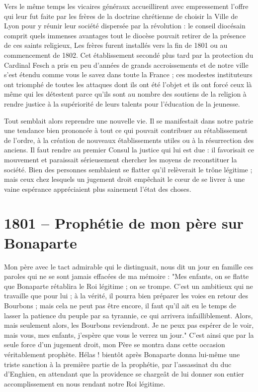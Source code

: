 \documentclass[11pt,a4paper]{report}
\begin{document}
Vers le même temps les vicaires généraux accueillirent avec empressement l'offre qui leur fut faite par les frères de la doctrine chrétienne de choisir la Ville de Lyon pour y réunir leur société dispersée par la révolution : le conseil diocésain comprit quels immenses avantages tout le diocèse pouvait retirer de la présence de ces saints religieux, Les frères furent installés vers la fin de 1801 ou au commencement de 1802. Cet établissement secondé plus tard par la protection du Cardinal Fesch a pris en peu d'années de grands accroissements et de notre ville s'est étendu comme vous le savez dans toute la France ; ces modestes instituteurs ont triomphé de toutes les attaques dont ils ont été l'objet et ils ont forcé ceux là même qui les détestent parce qu'ils sont au nombre des soutiens de la religion à rendre justice à la supériorité de leurs talents pour l'éducation de la jeunesse.

Tout semblait alors reprendre une nouvelle vie. Il se manifestait dans notre patrie une tendance bien prononcée à tout ce qui pouvait contribuer au rétablissement de l'ordre, à la création de nouveaux établissements utiles ou à la résurrection des anciens. Il faut rendre au premier Consul la justice qui lui est due : il favorisait ce mouvement et paraissait sérieusement chercher les moyens de reconstituer la société. Bien des personnes semblaient se flatter qu'il relèverait le trône légitime ; mais ceux chez lesquels un jugement droit empêchait le cœur de se livrer à une vaine espérance appréciaient plus sainement l'état des choses.

\section*{1801 -- Prophétie de mon père sur Bonaparte}

Mon père avec le tact admirable qui le distinguait, nous dit un jour en famille ces paroles qui ne se sont jamais effacées de ma mémoire : "Mes enfants, on se flatte que Bonaparte rétablira le Roi légitime ; on se trompe. C'est un ambitieux qui ne travaille que pour lui ; à la vérité, il pourra bien préparer les voies en retour des Bourbons ; mais cela ne peut pas être encore, il faut qu'il ait eu le temps de lasser la patience du peuple par sa tyrannie, ce qui arrivera infailliblement. Alors, mais seulement alors, les Bourbons reviendront. Je ne peux pas espérer de le voir, mais vous, mes enfants, j'espère que vous le verrez un jour." C'est ainsi que par la seule force d'un jugement droit, mon Père se montra dans cette occasion véritablement prophète. Hélas ! bientôt après Bonaparte donna lui-même une triste sanction à la première partie de la prophétie, par l'assassinat du duc d'Enghien, en attendant que la providence se chargeât de lui donner son entier accomplissement en nous rendant notre Roi légitime.
\end{document}
